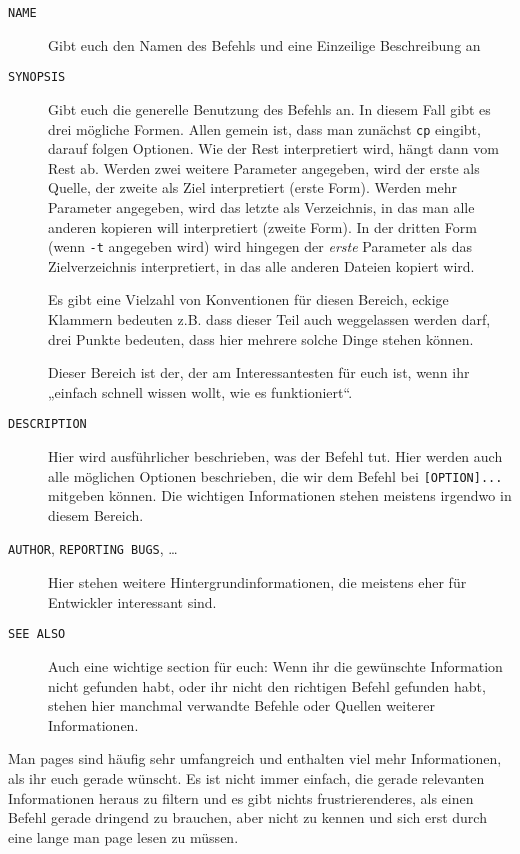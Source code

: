 \begin{description}
    \item[\texttt{NAME}]
        Gibt euch den Namen des Befehls und eine Einzeilige Beschreibung an
    \item[\texttt{SYNOPSIS}]
        Gibt euch die generelle Benutzung des Befehls an. In diesem Fall gibt
        es drei mögliche Formen. Allen gemein ist, dass man zunächst
        \texttt{cp} eingibt, darauf folgen Optionen. Wie der Rest interpretiert
        wird, hängt dann vom Rest ab. Werden zwei weitere Parameter angegeben,
        wird der erste als Quelle, der zweite als Ziel interpretiert (erste
        Form). Werden mehr Parameter angegeben, wird das letzte als
        Verzeichnis, in das man alle anderen kopieren will interpretiert
        (zweite Form). In der dritten Form (wenn \texttt{-t} angegeben wird)
        wird hingegen der \emph{erste} Parameter als das Zielverzeichnis
        interpretiert, in das alle anderen Dateien kopiert wird.

        Es gibt eine Vielzahl von Konventionen für diesen Bereich, eckige
        Klammern bedeuten z.B. dass dieser Teil auch weggelassen werden darf,
        drei Punkte bedeuten, dass hier mehrere solche Dinge stehen können.

        Dieser Bereich ist der, der am Interessantesten für euch ist, wenn ihr
        „einfach schnell wissen wollt, wie es funktioniert“.
    \item[\texttt{DESCRIPTION}]
        Hier wird ausführlicher beschrieben, was der Befehl tut. Hier werden
        auch alle möglichen Optionen beschrieben, die wir dem Befehl bei
        \texttt{[OPTION]...} mitgeben können. Die wichtigen Informationen
        stehen meistens irgendwo in diesem Bereich.
    \item[\texttt{AUTHOR}, \texttt{REPORTING BUGS}, \dots]
        Hier stehen weitere Hintergrundinformationen, die meistens eher für
        Entwickler interessant sind.
    \item[\texttt{SEE ALSO}]
        Auch eine wichtige section für euch: Wenn ihr die gewünschte
        Information nicht gefunden habt, oder ihr nicht den richtigen Befehl
        gefunden habt, stehen hier manchmal verwandte Befehle oder Quellen
        weiterer Informationen.
\end{description}

Man pages sind häufig sehr umfangreich und enthalten viel mehr Informationen,
als ihr euch gerade wünscht. Es ist nicht immer einfach, die gerade relevanten
Informationen heraus zu filtern und es gibt nichts frustrierenderes, als einen
Befehl gerade dringend zu brauchen, aber nicht zu kennen und sich erst durch
eine lange man page lesen zu müssen.

